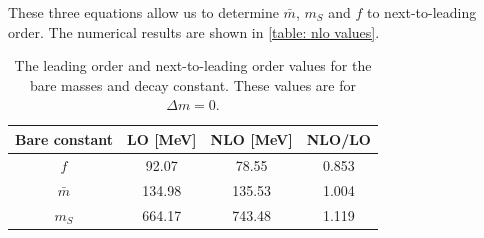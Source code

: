 \endgroup
%
These three equations allow us to determine $\bar m$, $m_S$ and $f$ to next-to-leading order.
The numerical results are shown in \autoref{table: nlo values}.

\begin{table}[H]
    \centering
    \caption{The leading order and next-to-leading order values for the bare masses and decay constant. These values are for $\Delta m = 0$.}
    \label{table: nlo values}
    \begin{tabular}{c c c c}
        \hline \hline
        Bare constant & LO [MeV] & NLO [MeV] & NLO/LO \\
        \hline
        $f$ & 92.07 & 78.55 & 0.853\\
        $\bar m$ & 134.98 & 135.53 & 1.004 \\
        $m_S$ & 664.17 & 743.48 & 1.119 \\
        \hline
    \end{tabular}
\end{table}


